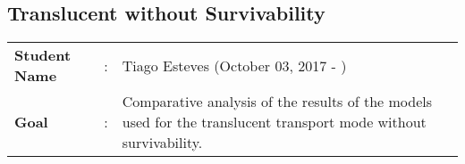 \clearpage

\subsection{Translucent without Survivability}\label{comparative_Transluc_Survivability}
\begin{tcolorbox}	
\begin{tabular}{p{2.75cm} p{0.2cm} p{10.5cm}} 	
\textbf{Student Name}  &:& Tiago Esteves    (October 03, 2017 - )\\
\textbf{Goal}          &:& Comparative analysis of the results of the models used for the translucent transport mode without survivability.
\end{tabular}
\end{tcolorbox}
\vspace{11pt}

